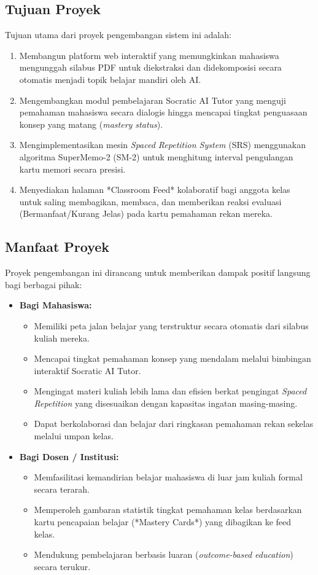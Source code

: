 \documentclass[12pt,a4paper]{article}
\begin{document}
\subsection{Tujuan Proyek}
Tujuan utama dari proyek pengembangan sistem ini adalah:
\begin{enumerate}
    \item Membangun platform web interaktif yang memungkinkan mahasiswa mengunggah silabus PDF untuk diekstraksi dan didekomposisi secara otomatis menjadi topik belajar mandiri oleh AI.
    \item Mengembangkan modul pembelajaran Socratic AI Tutor yang menguji pemahaman mahasiswa secara dialogis hingga mencapai tingkat penguasaan konsep yang matang (\textit{mastery status}).
    \item Mengimplementasikan mesin \textit{Spaced Repetition System} (SRS) menggunakan algoritma SuperMemo-2 (SM-2) untuk menghitung interval pengulangan kartu memori secara presisi.
    \item Menyediakan halaman *Classroom Feed* kolaboratif bagi anggota kelas untuk saling membagikan, membaca, dan memberikan reaksi evaluasi (Bermanfaat/Kurang Jelas) pada kartu pemahaman rekan mereka.
\end{enumerate}

\subsection{Manfaat Proyek}
Proyek pengembangan ini dirancang untuk memberikan dampak positif langsung bagi berbagai pihak:
\begin{itemize}
    \item \textbf{Bagi Mahasiswa:}
    \begin{itemize}
        \item Memiliki peta jalan belajar yang terstruktur secara otomatis dari silabus kuliah mereka.
        \item Mencapai tingkat pemahaman konsep yang mendalam melalui bimbingan interaktif Socratic AI Tutor.
        \item Mengingat materi kuliah lebih lama dan efisien berkat pengingat \textit{Spaced Repetition} yang disesuaikan dengan kapasitas ingatan masing-masing.
        \item Dapat berkolaborasi dan belajar dari ringkasan pemahaman rekan sekelas melalui umpan kelas.
    \end{itemize}
    \item \textbf{Bagi Dosen / Institusi:}
    \begin{itemize}
        \item Memfasilitasi kemandirian belajar mahasiswa di luar jam kuliah formal secara terarah.
        \item Memperoleh gambaran statistik tingkat pemahaman kelas berdasarkan kartu pencapaian belajar (*Mastery Cards*) yang dibagikan ke feed kelas.
        \item Mendukung pembelajaran berbasis luaran (\textit{outcome-based education}) secara terukur.
    \end{itemize}
\end{itemize}
\end{document}
